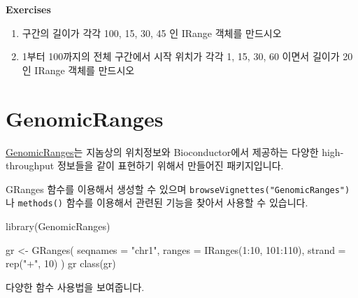 \documentclass[
]{book}
\newenvironment{Shaded}{\begin{snugshade}}{\end{snugshade}}
\newcommand{\AttributeTok}[1]{\textcolor[rgb]{0.77,0.63,0.00}{#1}}
\newcommand{\DecValTok}[1]{\textcolor[rgb]{0.00,0.00,0.81}{#1}}
\newcommand{\FunctionTok}[1]{\textcolor[rgb]{0.00,0.00,0.00}{#1}}
\newcommand{\NormalTok}[1]{#1}
\newcommand{\OtherTok}[1]{\textcolor[rgb]{0.56,0.35,0.01}{#1}}
\newcommand{\SpecialCharTok}[1]{\textcolor[rgb]{0.00,0.00,0.00}{#1}}
\newcommand{\StringTok}[1]{\textcolor[rgb]{0.31,0.60,0.02}{#1}}
\begin{document}
\textbf{Exercises }

\begin{enumerate}
\def\labelenumi{\arabic{enumi})}
\item
  구간의 길이가 각각 100, 15, 30, 45 인 IRange 객체를 만드시오
\item
  1부터 100까지의 전체 구간에서 시작 위치가 각각 1, 15, 30, 60 이면서 길이가 20 인 IRange 객체를 만드시오
\end{enumerate}

\hypertarget{genomicranges}{%
\section{GenomicRanges}\label{genomicranges}}

\href{https://bioconductor.org/packages/release/bioc/html/GenomicRanges.html}{GenomicRanges}는 지놈상의 위치정보와 Bioconductor에서 제공하는 다양한 high-throughput 정보들을 같이 표현하기 위해서 만들어진 패키지입니다.

GRanges 함수를 이용해서 생성할 수 있으며 \texttt{browseVignettes("GenomicRanges")} 나 \texttt{methods()} 함수를 이용해서 관련된 기능을 찾아서 사용할 수 있습니다.

\begin{Shaded}
\begin{Highlighting}[]
\FunctionTok{library}\NormalTok{(GenomicRanges)}


\NormalTok{gr }\OtherTok{\textless{}{-}} \FunctionTok{GRanges}\NormalTok{(}
  \AttributeTok{seqnames =} \StringTok{"chr1"}\NormalTok{, }
  \AttributeTok{ranges =} \FunctionTok{IRanges}\NormalTok{(}\DecValTok{1}\SpecialCharTok{:}\DecValTok{10}\NormalTok{, }\DecValTok{101}\SpecialCharTok{:}\DecValTok{110}\NormalTok{),}
  \AttributeTok{strand =} \FunctionTok{rep}\NormalTok{(}\StringTok{"+"}\NormalTok{, }\DecValTok{10}\NormalTok{)}
\NormalTok{)}
\NormalTok{gr}
\FunctionTok{class}\NormalTok{(gr)}
\end{Highlighting}
\end{Shaded}

다양한 함수 사용법을 보여줍니다.
\end{document}
